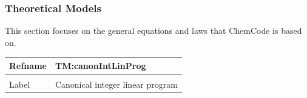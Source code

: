 \documentclass[12pt]{article}
\begin{document}
\subsubsection{Theoretical Models}
\label{Sec:TMs}
This section focuses on the general equations and laws that ChemCode is based on.

\vspace{\baselineskip}
\noindent
\begin{minipage}{\textwidth}
\begin{tabular}{>{\raggedright}p{}>{\raggedright\arraybackslash}p{}}
\toprule \textbf{Refname} & \textbf{TM:canonIntLinProg}
\label{TM:canonIntLinProg}
\\ \midrule \\
Label & Canonical integer linear program
        

\end{tabular}
\end{minipage}
\end{document}
